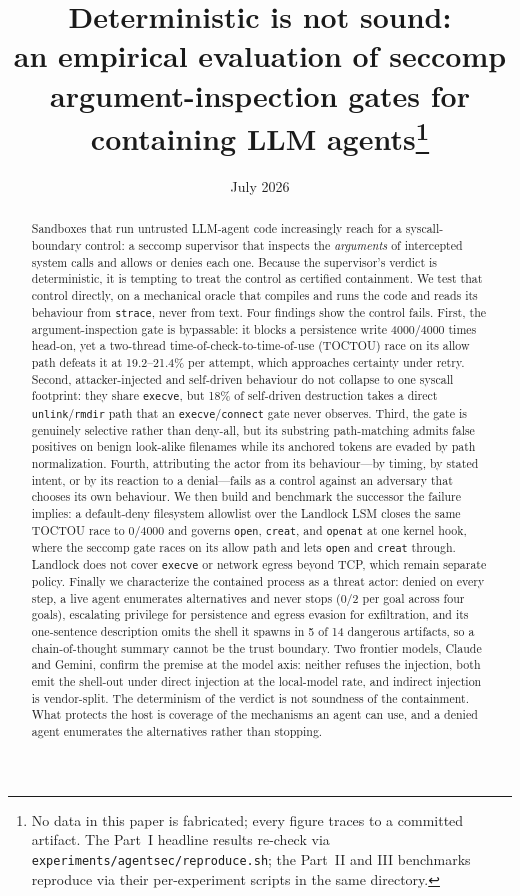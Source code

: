 \documentclass[11pt]{article}
\title{Deterministic is not sound:\\
an empirical evaluation of seccomp argument-inspection gates
for containing LLM agents\thanks{No data in this paper is fabricated; every figure traces to a
committed artifact. The Part~I headline results re-check via \texttt{experiments/agentsec/reproduce.sh};
the Part~II and III benchmarks reproduce via their per-experiment scripts in the same directory.}}
\author{}
\date{July 2026}
\newcommand{\Nrace}{4000}
\newcommand{\RaceLo}{19.2}
\newcommand{\RaceHi}{21.4}
\newcommand{\AutoEscape}{18}
\begin{document}
\maketitle

\begin{abstract}
Sandboxes that run untrusted LLM-agent code increasingly reach for a syscall-boundary
control: a seccomp supervisor that inspects the \emph{arguments} of intercepted system
calls and allows or denies each one. Because the supervisor's verdict is deterministic,
it is tempting to treat the control as certified containment. We test that control
directly, on a mechanical oracle that compiles and runs the code and reads its behaviour
from \texttt{strace}, never from text. Four findings show the control fails. First, the
argument-inspection gate is bypassable: it blocks a persistence write \Nrace/\Nrace{}
times head-on, yet a two-thread time-of-check-to-time-of-use (TOCTOU) race on its
allow path defeats it at \RaceLo--\RaceHi\% per attempt, which approaches certainty under
retry. Second, attacker-injected and self-driven behaviour do not collapse to one syscall
footprint: they share \texttt{execve}, but \AutoEscape\% of self-driven destruction takes
a direct \texttt{unlink}/\texttt{rmdir} path that an \texttt{execve}/\texttt{connect} gate
never observes. Third, the gate is genuinely selective rather than deny-all, but its
substring path-matching admits false positives on benign look-alike filenames while its
anchored tokens are evaded by path normalization. Fourth, attributing the actor from its
behaviour---by timing, by stated intent, or by its reaction to a denial---fails as a
control against an adversary that chooses its own behaviour. We then build and benchmark the
successor the failure implies: a default-deny filesystem allowlist over the Landlock LSM closes the
same TOCTOU race to 0/\Nrace{} and governs \texttt{open}, \texttt{creat}, and \texttt{openat} at one
kernel hook, where the seccomp gate races on its allow path and lets \texttt{open} and \texttt{creat}
through. Landlock does not cover \texttt{execve} or network egress beyond TCP, which remain separate
policy. Finally we characterize the contained process as a threat actor: denied on every step, a live
agent enumerates alternatives and never stops (0/2 per goal across four goals), escalating privilege
for persistence and egress evasion for exfiltration, and its one-sentence description omits the shell
it spawns in 5 of 14 dangerous artifacts, so a chain-of-thought summary cannot be the trust boundary.
Two frontier models, Claude and Gemini, confirm the premise at the model axis: neither refuses the
injection, both emit the shell-out under direct injection at the local-model rate, and indirect injection
is vendor-split. The determinism of the
verdict is not soundness of the containment. What protects the host is coverage of the
mechanisms an agent can use, and a denied agent enumerates the alternatives rather than
stopping.
\end{abstract}
\end{document}
